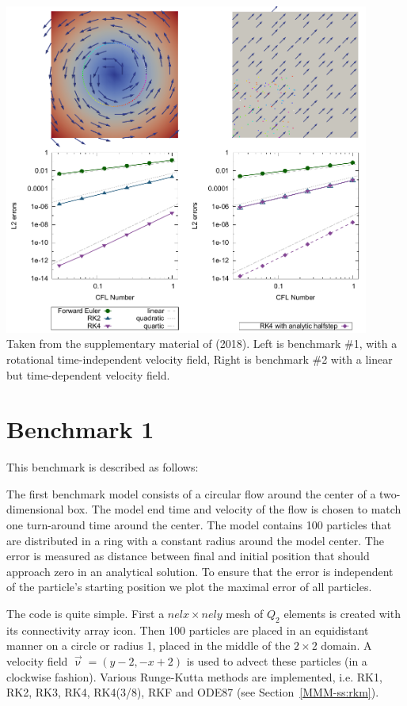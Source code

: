 \begin{center}
\includegraphics[width=12cm]{python_codes/fieldstone_122/images/galh18.png}\\
{\captionfont Taken from the supplementary material of \textcite{galh18} (2018). 
Left is benchmark \#1, with a rotational time-independent velocity field, Right is benchmark \#2
with a linear but time-dependent velocity field.}
\end{center}

\section*{Benchmark 1}

This benchmark is described as follows:
\begin{displayquote}
{\color{darkgray}
The first benchmark model consists of a circular flow
around the center of a two-dimensional box. The model
end time and velocity of the flow is chosen to match one
turn-around time around the center. The model contains
100 particles that are distributed in a ring with a constant
radius around the model center. The error is measured as
distance between final and initial position that should approach 
zero in an analytical solution. To ensure that the
error is independent of the particle’s starting position we
plot the maximal error of all particles.}
\end{displayquote}

The code is quite simple. First a $nelx \times nely$ mesh of $Q_2$ elements
is created with its connectivity array {\python icon}.
Then 100 particles are placed in an equidistant manner on a circle or radius 1, placed in
the middle of the $2\times 2$ domain. A velocity field $\vec\upnu=(y-2,-x+2)$ is used to 
advect these particles (in a clockwise fashion). 
Various Runge-Kutta methods are implemented, i.e. RK1, RK2, RK3, RK4, RK4(3/8), RKF and ODE87 
(see Section~\ref{MMM-ss:rkm}).

